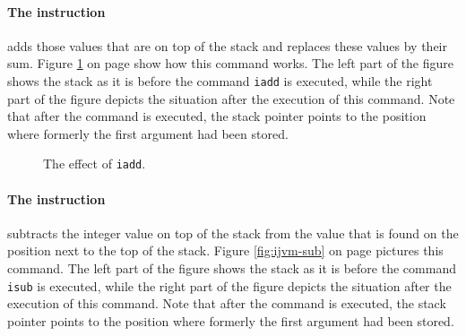 \paragraph{The instruction }
adds those values that are on top of the stack and replaces these values by their sum.
Figure \ref{fig:ijvm-add} on page \pageref{fig:ijvm-add} show how this command works.
The left part of the figure shows the stack as it is before the command \texttt{iadd} is executed,
while the right part of the figure depicts the situation after the execution of this command.  Note
that after the command is executed, the stack pointer points to the position where formerly the
first argument had been stored.


\setlength{\unitlength}{0.5cm}
\begin{figure}[!ht]
  \centering
{}
  \caption{The effect of \texttt{iadd}.}
  \label{fig:ijvm-add}
\end{figure}

\paragraph{The instruction }
subtracts the integer value on top of the stack from the value that is found on the position next to
the top of the stack.
Figure \ref{fig:ijvm-sub} on page \pageref{fig:ijvm-sub} pictures this command.
The left part of the figure shows the stack as it is before the command \texttt{isub} is executed,
while the right part of the figure depicts the situation after the execution of this command.  Note
that after the command is executed, the stack pointer points to the position where formerly the
first argument had been stored.



